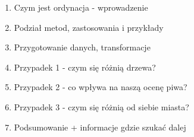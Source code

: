 \documentclass[\main/boa.tex]{subfiles}
\begin{document}
\planwarsztatu
\begin{enumerate}
\item Czym jest ordynacja - wprowadzenie
\item Podział metod, zastosowania i przykłady
\item Przygotowanie danych, transformacje
\item Przypadek 1 - czym się różnią drzewa?
\item Przypadek 2 - co wpływa na naszą ocenę piwa?
\item Przypadek 3 - czym się różnią od siebie miasta?
\item Podsumowanie + informacje gdzie szukać dalej
\end{enumerate}	 
\end{document}
